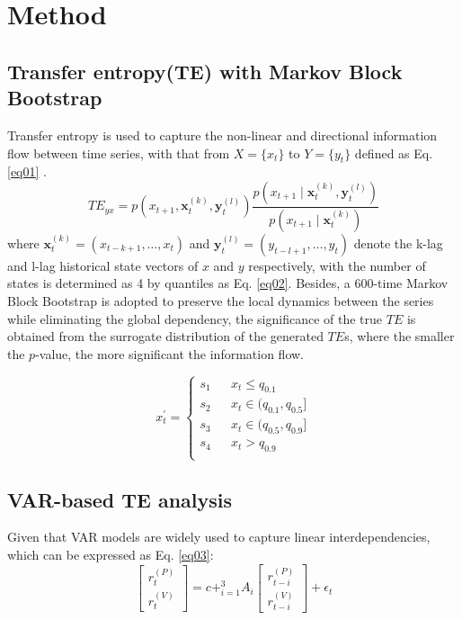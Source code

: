 \documentclass{elsarticle}
\def\log{}%
\def\sum{}%
\def\rightarrow{}%
\begin{document}
\section{Method}\label{sec:method}
\subsection{Transfer entropy({TE}) with Markov Block Bootstrap}
Transfer entropy is used to capture the non-linear and directional information flow between time series, with that from $X = \{x_{t}\}$ to $Y = \{y_{t}\}$ defined as Eq. \ref{eq01} \cite{TE01}.
\begin{equation} \label{eq01}
  TE_{y \rightarrow x} = \sum p(x_{t+1}, \mathbf{x}_t^{(k)}, \mathbf{y}_t^{(l)}) \log \frac{p(x_{t+1} \mid \mathbf{x}_t^{(k)}, \mathbf{y}_t^{(l)})}{p(x_{t+1} \mid \mathbf{x}_t^{(k)})}
  \end{equation}
  where $\mathbf{x}_t^{(k)} = (x_{t-k+1}, \dots, x_t)$ and $\mathbf{y}_t^{(l)} = (y_{t-l+1}, \dots, y_t)$ denote the k-lag and l-lag historical state vectors of $x$ and $y$ respectively, with the number of states is determined as 4 by quantiles as Eq. \ref{eq02}. Besides, a 600-time Markov Block Bootstrap is adopted to preserve the local dynamics between the series while eliminating the global dependency, the significance of the true $TE$ is obtained from the surrogate distribution of the generated $TE$s, where the smaller the $p$-value, the more significant the information flow.

\begin{equation}\label{eq02}
x^{'}_{t}=\left\{
\begin{array}{rcl}
s_{1}       & & {x_{t} \leq q_{0.1}}\\
s_{2}       & & {x_{t} \in (q_{0.1},q_{0.5}] }\\
s_{3}       & & {x_{t} \in (q_{0.5},q_{0.9}] }\\
s_{4}       & & {x_{t} > q_{0.9}} \\
\end{array} \right.
\end{equation}

\subsection{VAR-based TE analysis}
Given that VAR models are widely used to capture linear interdependencies, which can be expressed as Eq. \ref{eq03}:
\begin{equation} \label{eq03}
    \begin{bmatrix}
    r_t^{(P)} \\
    r_t^{(V)}
    \end{bmatrix}
    =
    c + \sum_{i=1}^{3} A_i
    \begin{bmatrix}
    r_{t-i}^{(P)} \\
    r_{t-i}^{(V)}
    \end{bmatrix}
    + \epsilon_t
    \end{equation}
\end{document}

